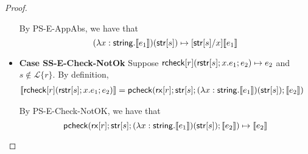 \documentclass[11pt,leqno]{article}
\theoremstyle{definition}
\newcommand{\Lagr}{\mathcal{L}}
\newcommand{\lang}[1]{\Lagr\{#1\}}
\newcommand{\rcheck}[4]{ {\sf rcheck}[#1](#2;#3;#4) }
\newcommand{\tcheck}[4]{{\sf pcheck}(#1; #2; #3; #4)}
\renewcommand{\tstr}[1]{{{\sf str}[#1]}}
\newcommand{\rx}[1]{ {\sf rx}[#1] }
\newcommand{\str}{{\sf string}}
\newcommand{\trden}[1]{\llbracket #1 \rrbracket} %
\begin{document}
\begin{proof}
\begin{itemize}[label=$ $,itemsep=1ex]
By PS-E-AppAbs, we have that 
$$(\lambda x : \str.\trden{e_1})(\tstr{s}) \mapsto [\tstr{s}/x]\trden{e_1}$$

\item \textbf{Case SS-E-Check-NotOk}
Suppose $\rcheck{r}{\rstr{s}}{x.e_1}{e_2} \mapsto e_2$ and $s \not \in \lang{r}$.
By definition,
\begin{align*}
\trden{\rcheck{r}{\rstr{s}}{x.e_1}{e_2}} &= \tcheck{\rx{r}}{\tstr{s}}{(\lambda x : \str. \trden{e_1})(\tstr{s})}{\trden{e_2}}
\end{align*}

By PS-E-Check-NotOK, we have that 
$$\tcheck{\rx{r}}{\tstr{s}}{(\lambda x : \str. \trden{e_1})(\tstr{s})}{\trden{e_2}} \mapsto \trden{e_2}$$



\end{itemize}
\end{proof}
\end{document}
